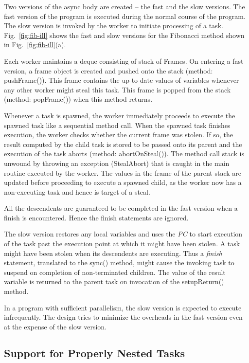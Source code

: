 Two versions of the async body are created -- the fast and the slow
versions. The fast version of the program is executed during the
normal course of the program. The slow version is invoked by the
worker to initiate processing of a task. Fig.~\ref{fig:fib-ill} shows
the fast and slow versions for the Fibonacci method shown in
Fig.~\ref{fig:fib-ill}(a).

Each worker maintains a deque consisting of stack of Frames. On
entering a fast version, a frame object is created and pushed onto the
stack (method: {\java pushFrame()}). This frame contains the
up-to-date values of variables whenever any other worker might steal
this task. This frame is popped from the stack (method: {\java popFrame()}) 
when this method returns.

Whenever a task is spawned, the worker immediately proceeds to execute
the spawned task like a sequential method call. When the spawned task
finishes execution, the worker checks whether the current frame was
stolen. If so, the result computed by the child task is stored to be
passed onto its parent and the execution of the task aborts (method:
{\java abortOnSteal()}). The method call stack is unwound by throwing
an exception ({\java StealAbort}) that is caught in the main
routine executed by the worker. The values in the frame of the parent
stack are updated before proceeding to execute a spawned child, as the
worker now has a non-executing task and hence is target of a steal. 

All the descendents are guaranteed to be completed in the fast version
when a {\java finish} is encountered. Hence the finish statements
are ignored.

The slow version restores any local variables and uses the {\em PC} to
start execution of the task past the execution point at which it might
have been stolen. A task might have been stolen when its descendents
are executing. Thus a {\em finish} statement, translated to the
{\java sync()} method, might cause the invoking task to suspend on
completion of non-terminated children. The value of the {\java result} 
variable is returned to the parent task on invocation of the
{\java setupReturn()} method. 

In a program with sufficient parallelism, the slow version is expected
to execute infrequently. The design tries to minimize the overheads in
the fast version even at the expense of the slow version. 

\subsection{Support for Properly Nested Tasks}

